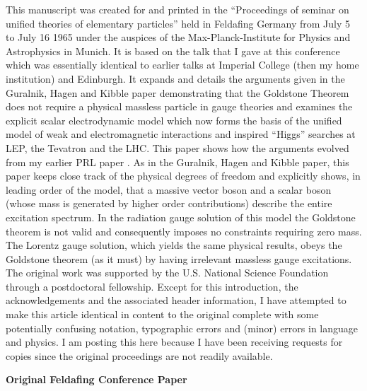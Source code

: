 \documentclass[%
  12pt,
  paper=letter,
  abstracton,
  pagesize=auto,
  version=last,
  DIV=calc
  ]{scrartcl}
\begin{document}
This manuscript was created for and printed in the ``Proceedings of
seminar on unified theories of elementary particles'' held in Feldafing
Germany from July 5 to July 16 1965 under the auspices of the
Max-Planck-Institute for Physics and Astrophysics in Munich. It is
based on the talk that I gave at this conference which was essentially
identical to earlier talks at Imperial College (then my home
institution) and Edinburgh. It expands and details the arguments given
in the Guralnik, Hagen and Kibble paper \cite{13} demonstrating that
the Goldstone Theorem does not require a physical massless particle in
gauge theories  and examines the explicit scalar electrodynamic model
which now forms the basis of the unified model of weak and
electromagnetic interactions and inspired ``Higgs'' searches at LEP, the
Tevatron and the LHC. This paper shows how the arguments evolved from
my earlier PRL paper \cite{10}. As in the Guralnik, Hagen and Kibble
paper, this paper keeps close track of the physical degrees of freedom
and explicitly shows, in leading order of the model, that a massive
vector boson and a scalar boson (whose mass is generated by higher
order contributions) describe the entire excitation spectrum. In the
radiation gauge solution of this model the  Goldstone theorem is not
valid and consequently imposes no constraints requiring zero mass. The
Lorentz gauge solution, which yields the same physical results, obeys
the Goldstone theorem (as it must) by having irrelevant massless gauge
excitations. The original work was supported by the U.S. National
Science Foundation through a postdoctoral fellowship. Except for this
introduction, the acknowledgements and the associated header information, I have attempted to
make this article identical in content to the original complete with
some potentially confusing notation, typographic errors and (minor) errors in language and physics. I am posting this here because I have been receiving requests for copies since the original proceedings are
not readily available.
\bigskip\bigskip

\vspace{0.5in}
\begin{center}
  \textbf{\textsf{Original Feldafing Conference Paper}}
\end{center}
\end{document}
